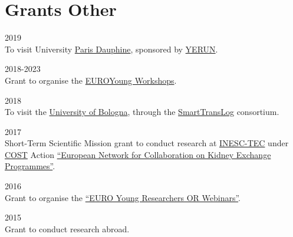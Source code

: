 \section*{Grants {\small Other}}

\begin{paracol}{2}
  \textsc{2019}
\switchcolumn
  \\
  To visit University \href{https://www.dauphine.psl.eu/}{Paris Dauphine}, sponsored by \href{https://www.yerun.eu}{YERUN}.
\end{paracol}

\begin{paracol}{2}
  \textsc{2018-2023}
\switchcolumn
  \\
  Grant to organise the \href{https://euroyoung.github.io/}{EUROYoung Workshops}.
\end{paracol}

\begin{paracol}{2}
  \textsc{2018}
\switchcolumn
  \\
  To visit the \href{https://www.unibo.it/}{University of Bologna}, through the \href{https://smarttranslog.wordpress.com/}{SmartTransLog} consortium.
\end{paracol}

\begin{paracol}{2}
  \textsc{2017}
\switchcolumn
  \\
  Short-Term Scientific Mission grant to conduct research at \href{https://www.inesctec.pt/}{INESC-TEC} under \href{http://www.cost.eu/}{COST} Action \href{http://www.enckep-cost.eu/}{``European Network for Collaboration on Kidney Exchange Programmes''}.
\end{paracol}

\begin{paracol}{2}
  \textsc{2016}
\switchcolumn
  \\
  Grant to organise the \href{https://www.airoyoung.org/resources/euro-seminars}{``EURO Young Researchers OR Webinars''}.
\end{paracol}

\begin{paracol}{2}
  \textsc{2015}
\switchcolumn
  \\
  Grant to conduct research abroad.
\end{paracol}